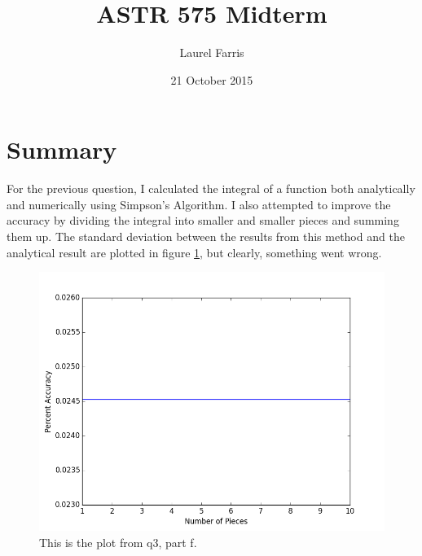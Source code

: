 \documentclass{article}
\title{ASTR 575 Midterm}
\author{Laurel Farris}
\date{21 October 2015}
\begin{document}
\maketitle

\section{Summary}

For the previous question, I calculated the integral of a function both 
analytically and numerically using Simpson's Algorithm. I also attempted to 
improve the accuracy by dividing the integral into smaller and smaller 
pieces and summing them up. The standard deviation between the results from 
this method and the analytical result are plotted in figure \ref{accuracy}, 
but clearly, something went wrong.

\begin{figure}[h]
  \centering
  \includegraphics[width=5.0in]{../q3/figure_1.png}
  \caption{This is the plot from q3, part f.}
  \label{accuracy}
\end{figure}
\end{document}
